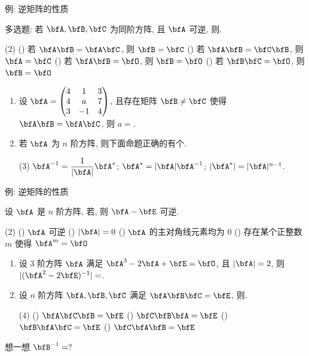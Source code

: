 \begin{frame}{例: 逆矩阵的性质}
	\onslide<+->
	\begin{example}
		多选题: 若 $\bfA,\bfB,\bfC$ 为同阶方阵, 且 $\bfA$ 可逆, 则.
		\begin{taskschoice}(2)
			() 若 $\bfA\bfB=\bfA\bfC$, 则 $\bfB=\bfC$
			() 若 $\bfA\bfB=\bfC\bfB$, 则 $\bfA=\bfC$
			() 若 $\bfA\bfB=\bfO$, 则 $\bfB=\bfO$
			() 若 $\bfB\bfC=\bfO$, 则 $\bfB=\bfO$
		\end{taskschoice}
	\end{example}
	\onslide<+->
	\begin{exercise}
		\begin{enumerate}
			\item 设 $\bfA=\begin{pmatrix}
				4&1&3\\4&a&7\\3&-1&4
			\end{pmatrix}$, 且存在矩阵 $\bfB\neq\bfC$ 使得 $\bfA\bfB=\bfA\bfC$, 则 $a=$\fillblankframe{$-3$}.
			\item 若 $\bfA$ 为 $n$ 阶方阵, 则下面命题正确的有\fillblankframe{$1$}个.
			\begin{tasks}[label={(\roman*)},label-format=\upshape\textcolor{main}](3)
				\task $\bfA^{-1}=\dfrac1{|\bfA|}\bfA^*$;
				\task $\bfA^*=|\bfA|\bfA^{-1}$;
				\task $|\bfA^*|=|\bfA|^{n-1}$.
			\end{tasks}
		\end{enumerate}
	\end{exercise}
\end{frame}


\begin{frame}{例: 逆矩阵的性质}
	\onslide<+->
	\begin{example}
		设 $\bfA$ 是 $n$ 阶方阵, 若, 则 $\bfA-\bfE$ 可逆.
		\begin{taskschoice}(2)
			() $\bfA$ 可逆
			() $|\bfA|=0$
			() $\bfA$ 的主对角线元素均为 $0$
			() 存在某个正整数 $m$ 使得 $\bfA^m=\bfO$
		\end{taskschoice}
	\end{example}
	\onslide<+->
	\begin{exercise}
		\begin{enumerate}
			\item 设 $3$ 阶方阵 $\bfA$ 满足 $\bfA^3-2\bfA+\bfE=\bfO$, 且 $|\bfA|=2$, 则 $|(\bfA^2-2\bfE)^{-1}|=$\fillblankframe{$-2$}.
			\item 设 $n$ 阶方阵 $\bfA,\bfB,\bfC$ 满足 $\bfA\bfB\bfC=\bfE$, 则\fillbraceframe{D}.
			\begin{taskschoice}(4)
				() $\bfA\bfC\bfB=\bfE$
				() $\bfC\bfB\bfA=\bfE$
				() $\bfB\bfA\bfC=\bfE$
				() $\bfC\bfA\bfB=\bfE$
			\end{taskschoice}
		\end{enumerate}
	\end{exercise}
	\onslide<+->
	想一想 $\bfB^{-1}=?$
\end{frame}



